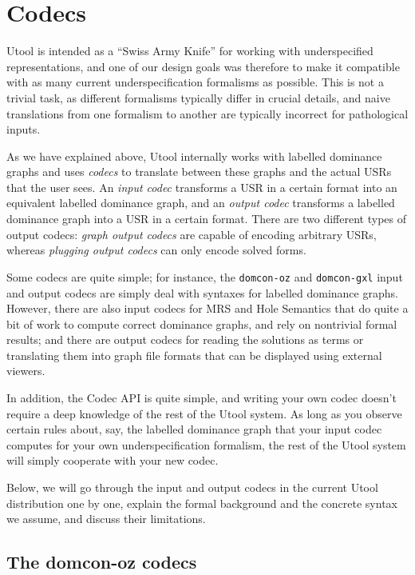 \section{Codecs}  \label{sec:codecs}

Utool is intended as a ``Swiss Army Knife'' for working with
underspecified representations, and one of our design goals was
therefore to make it compatible with as many current
underspecification formalisms as possible. This is not a trivial task,
as different formalisms typically differ in crucial details, and naive
translations from one formalism to another are typically incorrect for
pathological inputs.

As we have explained above, Utool internally works with labelled
dominance graphs and uses \emph{codecs} to translate between these
graphs and the actual USRs that the user sees. An \emph{input codec}
transforms a USR in a certain format into an equivalent labelled
dominance graph, and an \emph{output codec} transforms a labelled
dominance graph into a USR in a certain format. There are two
different types of output codecs: \emph{graph output codecs} are
capable of encoding arbitrary USRs, whereas \emph{plugging output
  codecs} can only encode solved forms.

Some codecs are quite simple; for instance, the \verb?domcon-oz? and
\verb?domcon-gxl? input and output codecs are simply deal with
syntaxes for labelled dominance graphs. However, there are also input
codecs for MRS and Hole Semantics that do quite a bit of work to
compute correct dominance graphs, and rely on nontrivial formal
results; and there are output codecs for reading the solutions as
terms or translating them into graph file formats that can be
displayed using external viewers.

In addition, the Codec API is quite simple, and writing your own codec
doesn't require a deep knowledge of the rest of the Utool system. As
long as you observe certain rules about, say, the labelled dominance
graph that your input codec computes for your own underspecification
formalism, the rest of the Utool system will simply cooperate with
your new codec.

Below, we will go through the input and output codecs in the current
Utool distribution one by one, explain the formal background and the
concrete syntax we assume, and discuss their limitations.



\subsection{The domcon-oz codecs}

